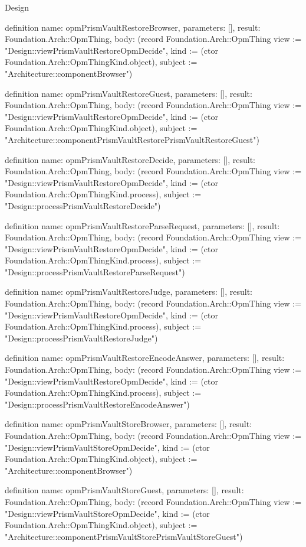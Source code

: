 \begin{lexlean}{Design}
\begin{semanticmodule}
definition{
  name: opmPrismVaultRestoreBrowser,
  parameters: [],
  result: Foundation.Arch::OpmThing,
  body: (record Foundation.Arch::OpmThing {view := "Design::viewPrismVaultRestoreOpmDecide", kind := (ctor Foundation.Arch::OpmThingKind.object), subject := "Architecture::componentBrowser"})
}

definition{
  name: opmPrismVaultRestoreGuest,
  parameters: [],
  result: Foundation.Arch::OpmThing,
  body: (record Foundation.Arch::OpmThing {view := "Design::viewPrismVaultRestoreOpmDecide", kind := (ctor Foundation.Arch::OpmThingKind.object), subject := "Architecture::componentPrismVaultRestorePrismVaultRestoreGuest"})
}

definition{
  name: opmPrismVaultRestoreDecide,
  parameters: [],
  result: Foundation.Arch::OpmThing,
  body: (record Foundation.Arch::OpmThing {view := "Design::viewPrismVaultRestoreOpmDecide", kind := (ctor Foundation.Arch::OpmThingKind.process), subject := "Design::processPrismVaultRestoreDecide"})
}

definition{
  name: opmPrismVaultRestoreParseRequest,
  parameters: [],
  result: Foundation.Arch::OpmThing,
  body: (record Foundation.Arch::OpmThing {view := "Design::viewPrismVaultRestoreOpmDecide", kind := (ctor Foundation.Arch::OpmThingKind.process), subject := "Design::processPrismVaultRestoreParseRequest"})
}

definition{
  name: opmPrismVaultRestoreJudge,
  parameters: [],
  result: Foundation.Arch::OpmThing,
  body: (record Foundation.Arch::OpmThing {view := "Design::viewPrismVaultRestoreOpmDecide", kind := (ctor Foundation.Arch::OpmThingKind.process), subject := "Design::processPrismVaultRestoreJudge"})
}

definition{
  name: opmPrismVaultRestoreEncodeAnswer,
  parameters: [],
  result: Foundation.Arch::OpmThing,
  body: (record Foundation.Arch::OpmThing {view := "Design::viewPrismVaultRestoreOpmDecide", kind := (ctor Foundation.Arch::OpmThingKind.process), subject := "Design::processPrismVaultRestoreEncodeAnswer"})
}

definition{
  name: opmPrismVaultStoreBrowser,
  parameters: [],
  result: Foundation.Arch::OpmThing,
  body: (record Foundation.Arch::OpmThing {view := "Design::viewPrismVaultStoreOpmDecide", kind := (ctor Foundation.Arch::OpmThingKind.object), subject := "Architecture::componentBrowser"})
}

definition{
  name: opmPrismVaultStoreGuest,
  parameters: [],
  result: Foundation.Arch::OpmThing,
  body: (record Foundation.Arch::OpmThing {view := "Design::viewPrismVaultStoreOpmDecide", kind := (ctor Foundation.Arch::OpmThingKind.object), subject := "Architecture::componentPrismVaultStorePrismVaultStoreGuest"})
}


\end{semanticmodule}
\end{lexlean}
